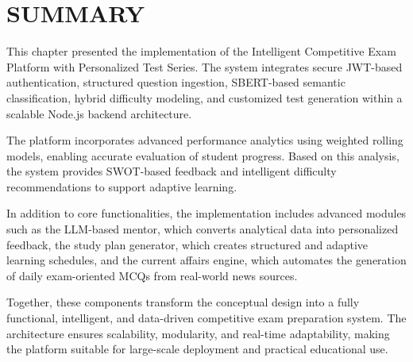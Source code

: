 \begin{sloppypar}
\section{\MakeUppercase{SUMMARY}}

This chapter presented the implementation of the Intelligent Competitive Exam Platform with Personalized Test Series. The system integrates secure JWT-based authentication, structured question ingestion, SBERT-based semantic classification, hybrid difficulty modeling, and customized test generation within a scalable Node.js backend architecture.

The platform incorporates advanced performance analytics using weighted rolling models, enabling accurate evaluation of student progress. Based on this analysis, the system provides SWOT-based feedback and intelligent difficulty recommendations to support adaptive learning.

In addition to core functionalities, the implementation includes advanced modules such as the LLM-based mentor, which converts analytical data into personalized feedback, the study plan generator, which creates structured and adaptive learning schedules, and the current affairs engine, which automates the generation of daily exam-oriented MCQs from real-world news sources.

Together, these components transform the conceptual design into a fully functional, intelligent, and data-driven competitive exam preparation system. The architecture ensures scalability, modularity, and real-time adaptability, making the platform suitable for large-scale deployment and practical educational use.

\end{sloppypar}
